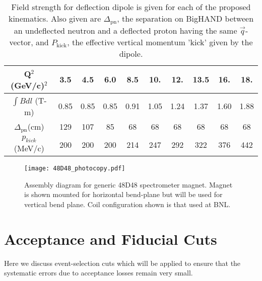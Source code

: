 \documentclass[12pt,letterpaper,oneside]{article}
\begin{document}
\begin{table}
\begin{center}
\caption{Field strength for deflection dipole is given for each
  of the proposed kinematics.  Also given are $\Delta_{\mbox{pn}}$,
  the separation on BigHAND between an undeflected neutron and a
  deflected proton having the same $\vec{q}$-vector, and
  $P_{\mbox{kick}}$, the effective vertical momentum 'kick' given by
  the dipole. \label{field_tab}}
\vspace{.2in}
{\begin{tabular}{|c|c|c|c|c|c|c|c|c|c|}
\hline
Q$^2$ (GeV/c)$^2$&3.5 & 4.5& 6.0& 8.5& 10.& 12.& 13.5& 16.& 18.\\
\hline
$\int B dl$ (T-m)&0.85&0.85&0.85&0.91&1.05&1.24&1.37&1.60&1.88\\
\hline
$\Delta_{\mbox{pn}}$(cm)&129&107&85&68&68&68&68&68&68\\
\hline
$p_{kick}$(MeV/c)&200&200&200&214&247&292&322&376&442\\
\hline
\end{tabular}}
\end{center}
\end{table}


\begin{figure}
\texttt{[image: 48D48\_photocopy.pdf]}\\
\caption{\label{48D48}
Assembly diagram for generic 48D48 spectrometer magnet. Magnet is shown mounted
for horizontal bend-plane but will be used for vertical bend plane.
Coil configuration shown is that used at BNL.
}
\end{figure}

\section{Acceptance and Fiducial Cuts}



\label{fiducials}

Here we discuss event-selection cuts which will be applied to
ensure that the
systematic errors due to acceptance losses remain very small.
\end{document}
